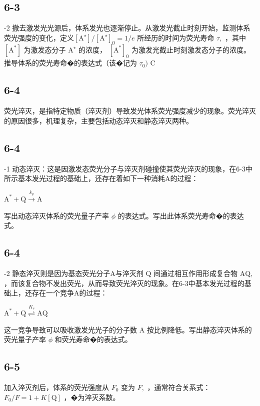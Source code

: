 \subsection*{6-3}
-2 撤去激发光光源后，体系发光也逐渐停⽌。从激发光截⽌时刻开始，监测体系荧光强度的变化，定义$[ \mathrm { A } ^ { \star } ] / [ \mathrm { A } ^ { \star } ] _ { 0 } = 1 / e$ 所经历的时间为荧光寿命 $\tau ,$ ，其中 $[ \mathrm { A } ^ { \ast } ]$ 为激发态分⼦ $\mathrm { A } ^ { \star }$ 的浓度， $[ \mathrm { A } ^ { \ast } ] _ { 0 }$ 为激发光截⽌时刻激发态分⼦的浓度。推导体系的荧光寿命�的表达式（该�记为 $\tau _ { 0 } )$ C

\subsection*{6-4}
荧光淬灭，是指特定物质（淬灭剂）导致发光体系荧光强度减少的现象。荧光淬灭的原因很多，机理复杂，主要包括动态淬灭和静态淬灭两种。

\subsection*{6-4}
-1 动态淬灭：这是因激发态荧光分⼦与淬灭剂碰撞使其荧光淬灭的现象，在6-3中所⽰基本发光过程的基础上，还存在着如下⼀种消耗A\*的过程：

$
\mathrm{A} ^ {*} + \mathrm{Q} \xrightarrow {k _ {q}} \mathrm{A}
$

写出动态淬灭体系的荧光量⼦产率 $\phi$ 的表达式。写出此体系荧光寿命�的表达式。

\subsection*{6-4}
-2 静态淬灭则是因为基态荧光分⼦A与淬灭剂 $\mathrm { Q }$ 间通过相互作⽤形成复合物 $\mathrm { A Q } ,$ ，⽽该复合物不发出荧光，从⽽导致荧光淬灭的现象。在6-3中基本发光过程的基础上，还存在⼀个竞争A的过程：

$
\mathrm{A} ^ {*} + \mathrm{Q} \stackrel {K _ {s}} {\rightleftharpoons} \mathrm{AQ}
$

这⼀竞争导致可以吸收激发光光⼦的分⼦数 A 按⽐例降低。写出静态淬灭体系的荧光量⼦产率 $\phi$ 和荧光寿命�的表达式。

\subsection*{6-5}
加⼊淬灭剂后，体系的荧光强度从 $F _ { 0 }$ 变为 $F ,$ ，通常符合关系式： $F _ { 0 } / F = 1 + K \left[ \mathrm { Q } \right]$ ，�为淬灭系数。

